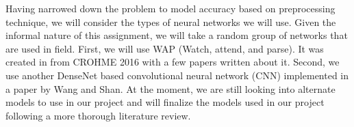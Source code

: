\documentclass[../proposal.tex]{subfiles}
\begin{document}
\indent Having narrowed down the problem to model accuracy based on preprocessing technique, we will consider the types of neural networks we will use. Given the informal nature of this assignment, we will take a random group of networks that are used in field. First, we will use WAP (Watch, attend, and parse). It was created in from CROHME 2016 with a few papers written about it. Second, we use another DenseNet based convolutional neural network (CNN) implemented in a paper by Wang and Shan. At the moment, we are still looking into alternate models to use in our project and will finalize the models used in our project following a more thorough literature review. 
\end{document}
